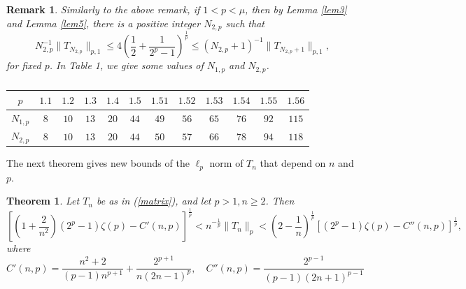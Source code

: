 \documentclass{amsart}
\newtheorem{theorem}{Theorem}
\newtheorem{remark}{Remark}
\begin{document}
\begin{remark}\label{rem2}
    Similarly to the above remark, if $1<p<\mu$, then by Lemma \ref{lem3} and Lemma \ref{lem5}, there is a positive integer $N_{2, p}$ such that 
    $$N_{2, p}^{-1}\|T_{N_{2, p}}\|_{p,1}\leq 4\left(\frac{1}{2}+\frac{1}{2^p-1}\right)^{\frac{1}{p}}\leq (N_{2, p}+1)^{-1}\|T_{N_{2, p}+1}\|_{p,1},$$
    for fixed $p$.  In Table 1, we give some values of $N_{1,p}$ and $N_{2,p}$.
\begin{table}[ht!]
\centering
\begin{tabular}{ |c|c|c|c|c|c|c|c|c|c|c|c| } 
\hline
$p$ & $1.1$ & $1.2$ & $1.3$ & $1.4$ & $1.5$ & $1.51$ & $1.52$ & $1.53$ & $1.54$ & $1.55$ & $1.56$\\
\hline
$N_{1,p}$ & $8$ & $10$ & $13$ & $20$ & $44$ & $49$ & $56$ & $65$ & $76$ & $92$ & $115$ \\
\hline
$N_{2,p}$ & $8$ & $10$ & $13$ & $20$ & $44$ & $50$ & $57$ & $66$ & $78$ & $94$ & $118$\\
\hline
\end{tabular}
\caption{}
\label{table:1}
\end{table}
\end{remark}
The next theorem gives new bounds of the $\ell_p$ norm of $T_n$ that depend on $n$ and $p$.
\begin{theorem}\label{thm2}
Let $T_n$ be as in (\ref{matrix}), and let $p>1, n\geq2$. Then
\begin{equation}\label{generalineq2}
   \left[\left(1+\frac{2}{n^2}\right)(2^p-1)\zeta(p)-C'(n,p)\right]^\frac{1}{p}< n^{-\frac{1}{p}}\|T_n\|_{p}<\left(2-\frac{1}{n}\right)^{\frac{1}{p}}\left[(2^p-1)\zeta(p)-C''(n,p)\right]^{\frac{1}{p}},
\end{equation} where
$$C'(n,p)=\frac{n^2+2}{(p-1)n^{p+1}}+\frac{2^{p+1}}{n(2n-1)^p},\quad C''(n,p)=\frac{2^{p-1}}{(p-1)(2n+1)^{p-1}}$$
\end{theorem}
\end{document}
